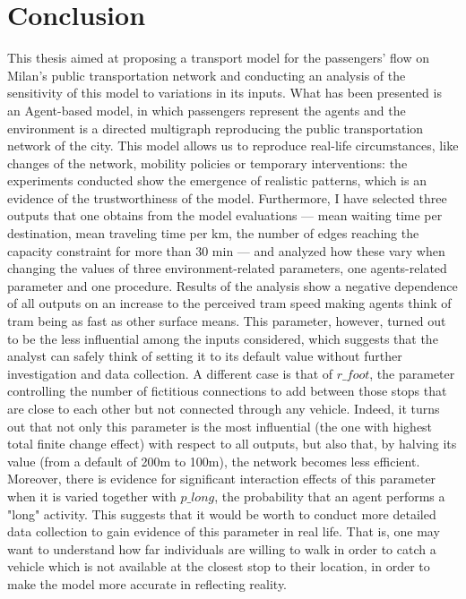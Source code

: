 \chapter{Conclusion}

This thesis aimed at proposing a transport model for the passengers' flow on Milan's public transportation network and conducting an analysis of the sensitivity of this model to variations in its inputs. What has been presented is an Agent-based model, in which passengers represent the agents and the environment is a directed multigraph reproducing the public transportation network of the city. 
This model allows us to reproduce real-life circumstances, like changes of the network, mobility policies or temporary interventions: the experiments conducted show the emergence of realistic patterns, which is an evidence of the trustworthiness of the model.
Furthermore, I have selected three outputs that one obtains from the model evaluations --- mean waiting time per destination, mean traveling time per km, the number of edges reaching the capacity constraint for more than 30 min --- and analyzed how these vary when changing the values of three environment-related parameters, one agents-related parameter and one procedure. Results of the analysis show a negative dependence of all outputs on an increase to the perceived tram speed making agents think of tram being as fast as other surface means. This parameter, however, turned out to be the less influential among the inputs considered, which suggests that the analyst can safely think of setting it to its default value without further investigation and data collection. A different case is that of $r\_foot$, the parameter controlling the number of fictitious connections to add between those stops that are close to each other but not connected through any vehicle. Indeed, it turns out that not only this parameter is the most influential (the one with highest total finite change effect) with respect to all outputs, but also that, by halving its value (from a default of 200m to 100m), the network becomes less efficient. Moreover, there is evidence for significant interaction effects of this parameter when it is varied together with $p\_long$, the probability that an agent performs a "long" activity. This suggests that it would be worth to conduct more detailed data collection to gain evidence of this parameter in real life. That is, one may want to understand how far individuals are willing to walk in order to catch a vehicle which is not available at the closest stop to their location, in order to make the model more accurate in reflecting reality. 
